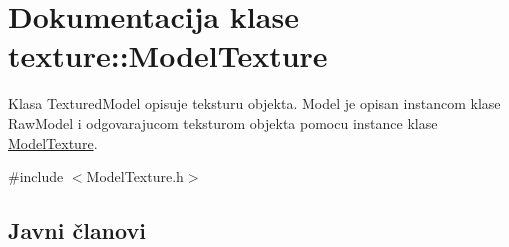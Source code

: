 \hypertarget{classtexture_1_1Texture}{}\section{Dokumentacija klase texture\+:\+:Model\+Texture}
\label{classtexture_1_1Texture}


Klasa Textured\+Model opisuje teksturu objekta. Model je opisan instancom klase Raw\+Model i odgovarajucom teksturom objekta pomocu instance klase \hyperlink{classtexture_1_1Texture}{Model\+Texture}.  




{\ttfamily \#include $<$Model\+Texture.\+h$>$}

\subsection*{Javni članovi}
